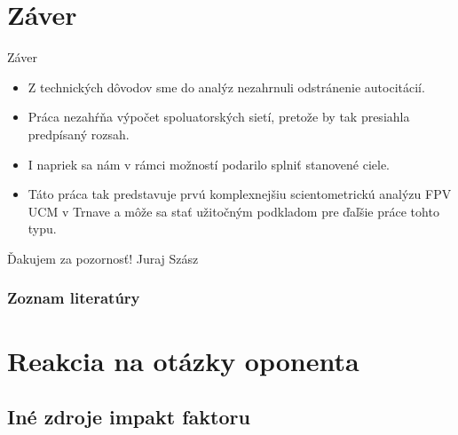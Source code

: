 \documentclass{beamer}
\begin{document}
\section{Záver}

\begin{frame}{Záver}
  \begin{itemize}
  \item<1-> Z technických dôvodov sme do analýz nezahrnuli odstránenie
    autocitácií.
  \item<2-> Práca nezahŕňa výpočet spoluatorských sietí, pretože by tak
    presiahla predpísaný rozsah.
  \item<3-> I napriek sa nám v rámci možností podarilo splniť stanovené ciele.
  \item<4-> Táto práca tak predstavuje prvú komplexnejšiu scientometrickú
    analýzu FPV UCM v Trnave a môže sa stať užitočným podkladom pre ďaľšie práce
    tohto typu.
  \end{itemize}
\end{frame}


\appendix

%
%
\begin{frame}
  \begin{center}
    \Huge Ďakujem za pozornosť!
    \vfill
    \Large Juraj Szász
  \end{center}
\end{frame}

%
%
\begin{frame}[t, allowframebreaks]
  \frametitle{Zoznam literatúry}
  {}
\end{frame}

%
%
\section{Reakcia na otázky oponenta}

\subsection{Iné zdroje impakt faktoru}
\end{document}
